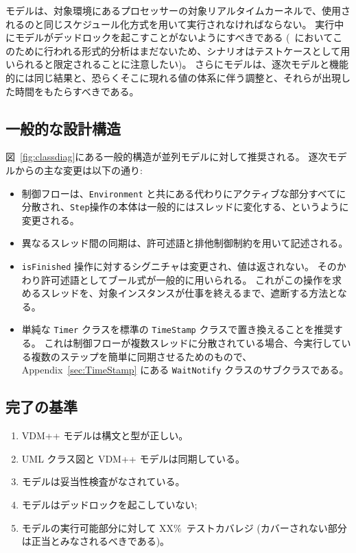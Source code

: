 \documentclass[\pformat,12pt]{jreport}
\begin{document}
モデルは、対象環境にあるプロセッサーの対象リアルタイムカーネルで、使用されるのと同じスケジュール化方式を用いて実行されなければならない。
実行中にモデルがデッドロックを起こすことがないようにすべきである (\VDMTools\ においてこのために行われる形式的分析はまだないため、シナリオはテストケースとして用いられると限定されることに注意したい)。 
さらにモデルは、逐次モデルと機能的には同じ結果と、恐らくそこに現れる値の体系に伴う調整と、それらが出現した時間をもたらすべきである。

\subsection{一般的な設計構造}\label{sec:designconcur}

 図~\ref{fig:classdiag}にある一般的構造が並列モデルに対して推奨される。
逐次モデルからの主な変更は以下の通り:

\begin{itemize}
\item 制御フローは、\texttt{Environment} と共にある代わりにアクティブな部分すべてに分散され、\texttt{Step}操作の本体は一般的にはスレッドに変化する、というように変更される。
\item 異なるスレッド間の同期は、許可述語と排他制御制約を用いて記述される。
\item  \texttt{isFinished} 操作に対するシグニチャは変更され、値は返されない。
そのかわり許可述語としてブール式が一般的に用いられる。
これがこの操作を求めるスレッドを、対象インスタンスが仕事を終えるまで、遮断する方法となる。
\item 単純な \texttt{Timer} クラスを標準の \texttt{TimeStamp} クラスで置き換えることを推奨する。
これは制御フローが複数スレッドに分散されている場合、今実行している複数のステップを簡単に同期させるためのもので、 Appendix~\ref{sec:TimeStamp} にある \texttt{WaitNotify} クラスのサブクラスである。
\end{itemize}

\subsection{完了の基準}

\begin{enumerate}
\item  VDM++ モデルは構文と型が正しい。
\item  UML クラス図と VDM++ モデルは同期している。
\item モデルは妥当性検査がなされている。
\item モデルはデッドロックを起こしていない;
\item モデルの実行可能部分に対して XX\%\ テストカバレジ
(カバーされない部分は正当とみなされるべきである)。
\end{enumerate}
\end{document}
